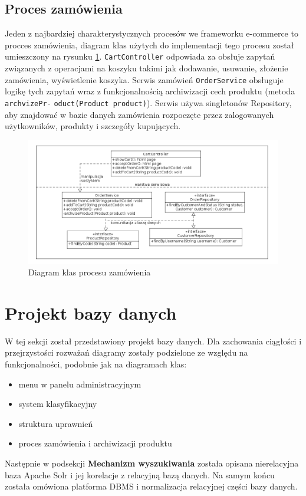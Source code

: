 \subsection{Proces zamówienia}
Jeden z najbardziej charakterystycznych procesów we frameworku e-commerce to procces zamówienia, diagram klas użytych do implementacji tego procesu został umieszczony na rysunku \ref{klasy_koszyk}. \texttt{CartController} odpowiada za obsłuje zapytań związanych z operacjami na koszyku takimi jak dodawanie, usuwanie, złożenie zamówienia, wyświetlenie koszyka. Serwis zamówień \texttt{OrderService} obsługuje logikę tych zapytań wraz z funkcjonalnością archiwizacji cech produktu (metoda \texttt{archvizePr-} \texttt{oduct(Product product)}). Serwis używa singletonów Repository, aby znajdować w bazie danych zamówienia rozpoczęte przez zalogowanych użytkowników, produkty i szczegóły kupujących. 
\begin{figure}
	\begin{center}
		\includegraphics[scale=0.4]{klasy_koszyk.png}
	\end{center}
	\caption{{\color{black}Diagram klas procesu zamówienia}} \label{klasy_koszyk}
\end{figure}

\newpage
\section{Projekt bazy danych}
W tej sekcji został przedstawiony projekt bazy danych. Dla zachowania ciągłości i przejrzystości rozważań diagramy zostały podzielone ze względu na funkcjonalności, podobnie jak na diagramach klas: 
\begin{itemize}
	\item menu w panelu administracyjnym
	\item system klasyfikacyjny
	\item struktura uprawnień
	\item proces zamówienia i archiwizacji produktu
\end{itemize}
Następnie w podsekcji \textbf{Mechanizm wyszukiwania} została opisana nierelacyjna baza Apache Solr i jej korelacje z relacyjną bazą danych. Na samym końcu została omówiona platforma DBMS i normalizacja relacyjnej części bazy danych.

